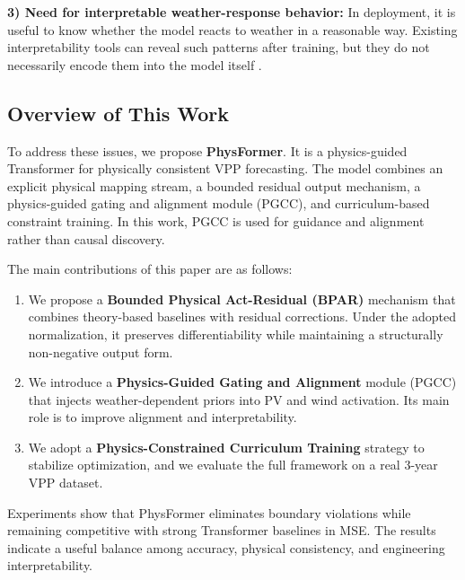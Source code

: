 \textbf{3) Need for interpretable weather-response behavior:} In deployment, it is useful to know whether the model reacts to weather in a reasonable way. Existing interpretability tools can reveal such patterns after training, but they do not necessarily encode them into the model itself \cite{Vle2025,Lovo2025,Arabzadeh2025}.

\subsection{Overview of This Work}
To address these issues, we propose \textbf{PhysFormer}. It is a physics-guided Transformer for physically consistent VPP forecasting. The model combines an explicit physical mapping stream, a bounded residual output mechanism, a physics-guided gating and alignment module (PGCC), and curriculum-based constraint training. In this work, PGCC is used for guidance and alignment rather than causal discovery.

The main contributions of this paper are as follows:

\begin{enumerate}
    \item We propose a \textbf{Bounded Physical Act-Residual (BPAR)} mechanism that combines theory-based baselines with residual corrections. Under the adopted normalization, it preserves differentiability while maintaining a structurally non-negative output form.

    \item We introduce a \textbf{Physics-Guided Gating and Alignment} module (PGCC) that injects weather-dependent priors into PV and wind activation. Its main role is to improve alignment and interpretability.

    \item We adopt a \textbf{Physics-Constrained Curriculum Training} strategy to stabilize optimization, and we evaluate the full framework on a real 3-year VPP dataset.
\end{enumerate}

Experiments show that PhysFormer eliminates boundary violations while remaining competitive with strong Transformer baselines in MSE. The results indicate a useful balance among accuracy, physical consistency, and engineering interpretability.


